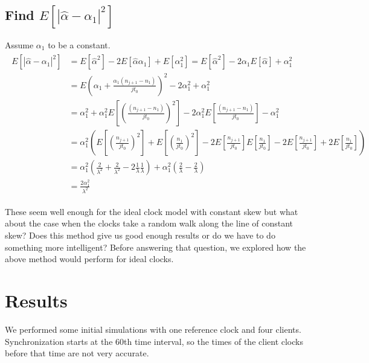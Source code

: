 \documentclass[10pt, journal, letter, onecolumn]{IEEEtran}
\begin{document}
\subsection{Find $E[ | \hat{\alpha} - \alpha_1 |^2 ]$}
Assume $\alpha_1$ to be a constant.
\begin{eqnarray}
\begin{aligned}
E[ | \hat{\alpha} - \alpha_1 |^2 ] &= E[\hat{\alpha}^2] - 2 E[\hat{\alpha} \alpha_1] + E[\alpha_1^2] = E[\hat{\alpha}^2] - 2 \alpha_1 E[\hat{\alpha}] + \alpha_1^2\\
&= E\left( \alpha_1 +  \frac{  \alpha_1 (n_{j+1} - n_1)}{j t_0}\right)^2 - 2 \alpha_1^2 + \alpha_1^2\\
&= \alpha_1^2 + \alpha_1^2 E\left[\left(\frac{(n_{j+1} - n_1)}{j t_0}\right)^2\right] - 2\alpha_1^2 E\left[\frac{(n_{j+1} - n_1)}{j t_0}\right]  - \alpha_1^2\\
&= \alpha_1^2 \left(E\left[\left(\frac{n_{j+1}}{j t_0}\right)^2\right] + E\left[\left(\frac{n_{1}}{j t_0}\right)^2\right] - 2 E\left[\frac{n_{j+1}}{j t_0}\right] E\left[\frac{n_{1}}{j t_0}\right] - 2E\left[\frac{n_{j+1}}{j t_0}\right] + 2E\left[\frac{n_{1}}{j t_0}\right]\right)\\
&= \alpha_1^2 \left( \frac{2}{\lambda^2} + \frac{2}{\lambda^2} - 2\frac{1}{\lambda}\frac{1}{\lambda}\right) + \alpha_1^2\left( \frac{2}{\lambda} - \frac{2}{\lambda} \right)\\
&= \frac{2\alpha_1^2}{\lambda^2}
\end{aligned}
\end{eqnarray}

These seem well enough for the ideal clock model with constant skew but what about the case when the clocks take a random walk along the line of constant skew? Does this method give us good enough results or do we have to do something more intelligent? Before answering that question, we explored how the above method would perform for ideal clocks.

\section{Results}
\label{sec:results}
We performed some initial simulations with one reference clock and four clients. Synchronization starts at the $60$th time interval, so the times of the client clocks before that time are not very accurate.
\end{document}
